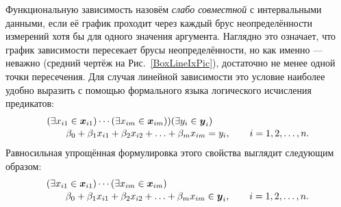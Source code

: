 \documentclass[a5paper,openany]{book}
\newcommand{\mbf}[1]{\protect\text{\boldmath$#1$}}
\begin{document}
  
Функциональную зависимость назовём \textit{слабо совместной} с интервальными данными, 
если её график проходит через каждый брус неопределённости измерений хотя бы для одного 
значения аргумента. Наглядно это означает, что график зависимости пересекает брусы 
неопределённости, но как именно --- неважно (средний чертёж на Рис.~\ref{BoxLineIxPic}), 
достаточно не менее одной точки пересечения. Для случая линейной зависимости это условие 
наиболее удобно выразить с помощью формального языка логического исчисления предикатов: 
\begin{equation*}
\index{слабо совместная зависимость} 
\begin{array}{l}
(\exists x_{i1}\in\mbf{x}_{i1}) \cdots (\exists x_{im}\in\mbf{x}_{im}))
                                                    (\exists y_{i}\in\mbf{y}_{i}) \\[1pt]  
\qquad \beta_0 + \beta_1 x_{i1} + \beta_2 x_{i2} + \ldots + \beta_m x_{im} = y_{i}, 
\qquad i = 1,2,\ldots,n. 
\end{array} 
\end{equation*} 
Равносильная упрощённая формулировка этого свойства выглядит следующим образом: 
\begin{equation*}
\begin{array}{l}
(\exists x_{i1}\in\mbf{x}_{i1}) \cdots (\exists x_{im}\in\mbf{x}_{im}) \\[1pt]  
\qquad \beta_0 + \beta_1 x_{i1} + \beta_2 x_{i2} + \ldots + \beta_m x_{im} \in\mbf{y}_{i}, 
\qquad i = 1,2,\ldots,n. 
\end{array} 
\end{equation*} 
  
\end{document}
